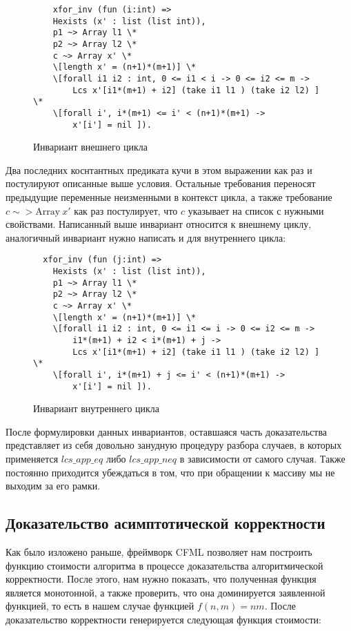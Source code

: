\begin{figure}[H]
  \caption{Инвариант внешнего цикла}
  \label{code:outer_cycle_inv}
  \begin{verbatim}
    xfor_inv (fun (i:int) => 
    Hexists (x' : list (list int)),
    p1 ~> Array l1 \*
    p2 ~> Array l2 \*
    c ~> Array x' \*
    \[length x' = (n+1)*(m+1)] \*
    \[forall i1 i2 : int, 0 <= i1 < i -> 0 <= i2 <= m -> 
        Lcs x'[i1*(m+1) + i2] (take i1 l1 ) (take i2 l2) ] \* 
    \[forall i', i*(m+1) <= i' < (n+1)*(m+1) ->
        x'[i'] = nil ]). 
  \end{verbatim}
\end{figure}

Два последних коснтантных предиката кучи в этом выражении как раз и постулируют описанные выше условия. Остальные требования переносят
предыдущие переменные неизменными в контекст цикла, а также требование $c \sim> \text{Array}\ x'$  как раз постулирует, что $c$ указывает на
список с нужными свойствами. Написанный выше инвариант относится к внешнему циклу, аналогичный инвариант нужно написать и для внутреннего цикла:

\begin{figure}[H]
  \caption{Инвариант внутреннего цикла}
  \label{code:inner_cycle_inv}
  \begin{verbatim}
  xfor_inv (fun (j:int) => 
    Hexists (x' : list (list int)),
    p1 ~> Array l1 \*
    p2 ~> Array l2 \*
    c ~> Array x' \*
    \[length x' = (n+1)*(m+1)] \*
    \[forall i1 i2 : int, 0 <= i1 <= i -> 0 <= i2 <= m -> 
        i1*(m+1) + i2 < i*(m+1) + j -> 
        Lcs x'[i1*(m+1) + i2] (take i1 l1 ) (take i2 l2) ] \*
    \[forall i', i*(m+1) + j <= i' < (n+1)*(m+1) ->
        x'[i'] = nil ]). 
  \end{verbatim}
\end{figure}

После формулировки данных инвариантов, оставшаяся часть доказательства представляет из себя довольно занудную процедуру
разбора случаев, в которых применяется $lcs\_app\_eq$ либо $lcs\_app\_neq$ в зависимости от самого случая. Также постоянно приходится
убеждаться в том, что при обращении к массиву мы не выходим за его рамки.
\subsection{Доказательство асимптотической корректности}
Как было изложено раньше, фреймворк CFML \cite{base_article} позволяет нам построить функцию стоимости алгоритма в процессе
доказательства алгоритмической корректности. После этого, нам нужно показать, что полученная функция является монотонной, а
также проверить, что она доминируется заявленной функцией, то есть в нашем случае функцией $f(n,m) = nm$. После доказательство
корректности генерируется следующая функция стоимости:


